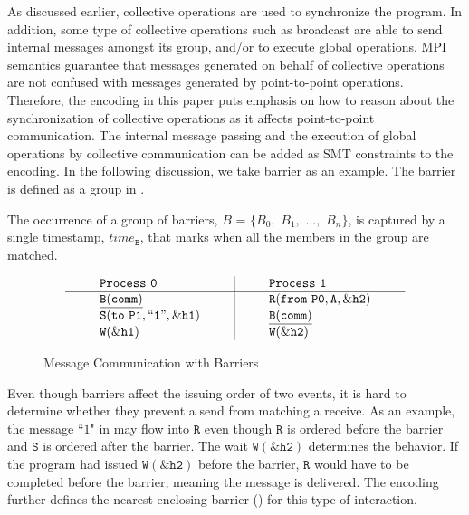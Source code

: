 As discussed earlier, collective operations are used to synchronize the program. In addition, some type of collective operations such as broadcast are able to send internal messages amongst its group, and/or to execute global operations. MPI semantics guarantee that messages generated on behalf of collective operations are not confused with messages generated by point-to-point operations. Therefore, the encoding in this paper puts emphasis on how to reason about the synchronization of collective operations as it affects point-to-point communication. The internal message passing and the execution of global operations by collective communication can be added as SMT constraints to the encoding. In the following discussion, we take barrier as an example. The barrier is defined as a group in . 

\begin{definition}[Barrier]\label{def:barrier}
The occurrence of a group of barriers, $B$ = $\{B_0,$ $B_1,$ $...,$ $B_n\}$, is captured by a
single timestamp, $\mathit{time}_\mathtt{B}$, that marks when all the members in the group are matched.  
\end{definition}

\begin{figure}[h]
\[
\begin{array}{l|l}
\;\;\;\;\;\;\;\;\mathtt{Process\ 0}\;\;\;\;\;\;\;\; & \;\;\;\;\;\;\;\; \mathtt{Process\ 1}\;\;\;\;\;\;\;\; \\
\hline
\;\;\;\;\;\;\;\;\mathtt{\underline{B(comm)}}\;\;\;\;\;\;\;\; & \;\;\;\;\;\;\;\; \mathtt{R(from\ P0,A,\&h2)}\;\;\;\;\;\;\;\; \\
\;\;\;\;\;\;\;\;\mathtt{S(to\ P1,``1",\&h1)}\;\;\;\;\;\;\;\; & \;\;\;\;\;\;\;\; \mathtt{\underline{B(comm)}}\;\;\;\;\;\;\;\; \\
\;\;\;\;\;\;\;\;\mathtt{W(\&h1)}\;\;\;\;\;\;\;\; & \;\;\;\;\;\;\;\; \mathtt{W(\&h2)}\;\;\;\;\;\;\;\; \\
\end{array}
\]
\caption{Message Communication with Barriers} \label{fig:mc_barrier1}
\end{figure}

Even though barriers affect the issuing order of two events, it is hard to determine whether they prevent a send from matching a receive. As an example, the message ``$1$" in  may flow into $\mathtt{R}$ even though $\mathtt{R}$ is ordered before the barrier and $\mathtt{S}$ is ordered after the barrier. The wait $\mathtt{W(\&h2)}$ determines the behavior. If the program had issued $\mathtt{W(\&h2)}$ before the barrier, $\mathtt{R}$ would have to be completed before the barrier, meaning the message is delivered. The encoding further defines the nearest-enclosing barrier () for this type of interaction.

